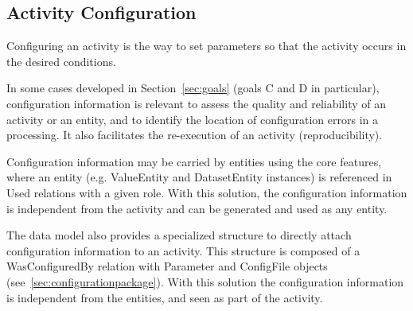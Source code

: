
\subsection{Activity Configuration}
\label{sec:configuration}

Configuring an activity is the way to set parameters so that the activity occurs in the desired conditions.

In some cases developed in Section~\ref{sec:goals} (goals C and D in particular), configuration information is relevant to assess the quality and reliability of an activity or an entity, and to identify the location of configuration errors in a processing. It also facilitates the re-execution of an activity (reproducibility).

Configuration information may be carried by entities using the core features, where an entity (e.g. ValueEntity and DatasetEntity instances) is referenced in Used relations with a given role. With this solution, the configuration information is independent from the activity and can be generated and used as any entity.

The data model also provides a specialized structure to directly attach configuration information to an activity. This structure is composed of a WasConfiguredBy relation with Parameter and ConfigFile objects (see~\ref{sec:configurationpackage}). With this solution the configuration information is independent from the entities, and seen as part of the activity.







